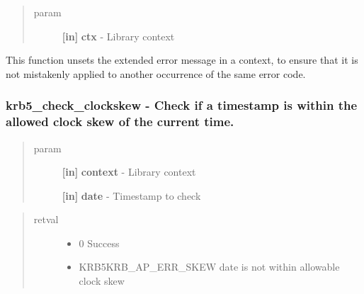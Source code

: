 \documentclass[letterpaper,10pt,english]{sphinxmanual}
\begin{document}
\begin{fulllineitems}
\label{appdev/refs/api/krb5_clear_error_message:krb5_clear_error_message}
\end{fulllineitems}

\begin{quote}\begin{description}
\item[{param}] \leavevmode
\textbf{{[}in{]}} \textbf{ctx} - Library context

\end{description}\end{quote}

This function unsets the extended error message in a context, to ensure that it is not mistakenly applied to another occurrence of the same error code.


\subsubsection{krb5\_check\_clockskew -  Check if a timestamp is within the allowed clock skew of the current time.}
\label{appdev/refs/api/krb5_check_clockskew:krb5-check-clockskew-check-if-a-timestamp-is-within-the-allowed-clock-skew-of-the-current-time}\label{appdev/refs/api/krb5_check_clockskew::doc}

\begin{fulllineitems}
\label{appdev/refs/api/krb5_check_clockskew:krb5_check_clockskew}
\end{fulllineitems}

\begin{quote}\begin{description}
\item[{param}] \leavevmode
\textbf{{[}in{]}} \textbf{context} - Library context

\textbf{{[}in{]}} \textbf{date} - Timestamp to check

\end{description}\end{quote}
\begin{quote}\begin{description}
\item[{retval}] \leavevmode\begin{itemize}
\item {} 
0   Success

\item {} 
KRB5KRB\_AP\_ERR\_SKEW    date is not within allowable clock skew

\end{itemize}

\end{description}\end{quote}
\end{document}
